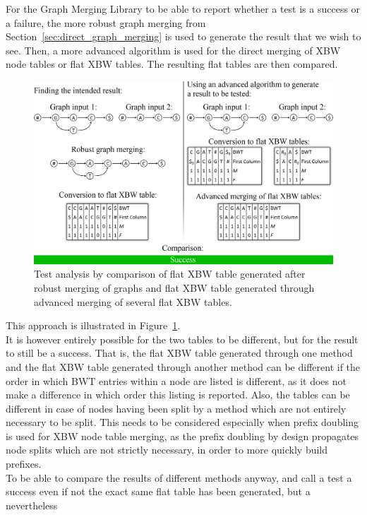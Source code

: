 \documentclass[a4paper,12pt,twoside,BCOR=10mm]{scrbook}
\begin{document}
For the Graph Merging Library to be able to report whether a test is a success or
a failure, the more robust graph merging from Section~\ref{sec:direct_graph_merging}
is used to generate the result that we
wish to see. Then, a more advanced algorithm is used for the direct merging
of XBW node tables or flat XBW tables.
The resulting flat tables are then compared.
\begin{figure}[!htb]
\centering
\includegraphics[width=\textwidth]{evo_test_comparison.png}
\caption[Test analysis]{Test analysis by comparison of flat XBW table generated after robust merging of graphs and flat XBW table generated through advanced merging of several flat XBW tables.} \label{fig:evo_test_comparison}
\end{figure}
This approach is illustrated in Figure~\ref{fig:evo_test_comparison}. \\
It is however entirely possible for the two tables to be different, but for the result to
still be a success. That is, the flat XBW table generated through one method and the
flat XBW table generated through another method can be different if the order in which BWT
entries within a node are listed is different, as it does not make a difference in which order
this listing is reported. Also, the tables can be different in case of nodes having been split
by a method which are not entirely necessary to be split.
This needs to be considered especially when prefix doubling is used for XBW node table merging,
as the prefix doubling by design propagates node splits which are not strictly necessary,
in order to more quickly build prefixes. \\
To be able to compare the results of different methods anyway, and call a test
a success even if not the exact same flat table has been generated, but a nevertheless
\end{document}
